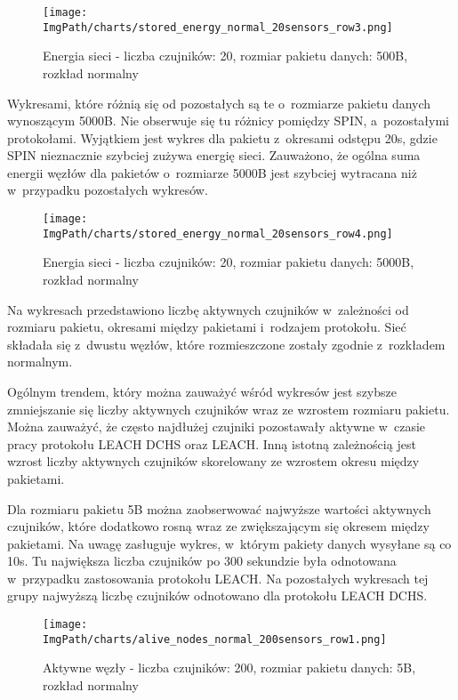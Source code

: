 \begin{figure}[H]
	\begin{center}
		\texttt{[image: \\ImgPath/charts/stored\_energy\_normal\_20sensors\_row3.png]}
	\end{center}
	\caption{Energia sieci - liczba czujników: 20, rozmiar pakietu danych: 500B, rozkład normalny}
\end{figure}

Wykresami, które różnią się od pozostałych są te o~rozmiarze pakietu danych wynoszącym 5000B. Nie obserwuje się tu różnicy pomiędzy SPIN, a~pozostałymi protokołami. Wyjątkiem jest wykres dla pakietu z~okresami odstępu 20s, gdzie SPIN nieznacznie szybciej zużywa energię sieci. Zauważono, że ogólna suma energii węzłów dla pakietów o~rozmiarze 5000B jest szybciej wytracana niż w~przypadku pozostałych wykresów.

\begin{figure}[H]
	\begin{center}
		\texttt{[image: \\ImgPath/charts/stored\_energy\_normal\_20sensors\_row4.png]}
	\end{center}
	\caption{Energia sieci - liczba czujników: 20, rozmiar pakietu danych: 5000B, rozkład normalny}
\end{figure}

Na wykresach przedstawiono liczbę aktywnych czujników w~zależności od rozmiaru pakietu, okresami między pakietami i~rodzajem protokołu. Sieć składała się z~dwustu węzłów, które rozmieszczone zostały zgodnie z~rozkładem normalnym.

Ogólnym trendem, który można zauważyć wśród wykresów jest szybsze zmniejszanie się liczby aktywnych czujników wraz ze wzrostem rozmiaru pakietu. Można zauważyć, że często najdłużej czujniki pozostawały aktywne w~czasie pracy protokołu LEACH DCHS oraz LEACH. Inną istotną zależnością jest wzrost liczby aktywnych czujników skorelowany ze wzrostem okresu między pakietami.
 
Dla rozmiaru pakietu 5B można zaobserwować najwyższe wartości aktywnych czujników, które dodatkowo rosną wraz ze zwiększającym się okresem między pakietami. Na uwagę zasługuje wykres, w~którym pakiety danych wysyłane są co 10s. Tu największa liczba czujników po 300 sekundzie była odnotowana w~przypadku zastosowania protokołu LEACH. Na pozostałych wykresach tej grupy najwyższą liczbę czujników odnotowano dla protokołu LEACH DCHS.

\begin{figure}[H]
	\begin{center}
		\texttt{[image: \\ImgPath/charts/alive\_nodes\_normal\_200sensors\_row1.png]}
	\end{center}
	\caption{Aktywne węzły - liczba czujników: 200, rozmiar pakietu danych: 5B, rozkład normalny}
\end{figure}


